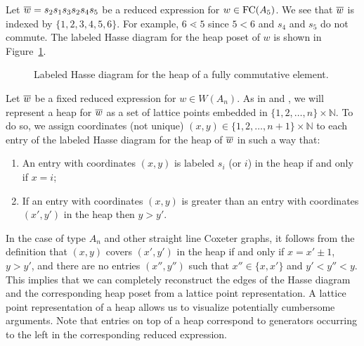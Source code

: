 \begin{example}\label{ex:Hasse}
Let $\overline{w}=s_{2}s_{1}s_{3}s_{2}s_{4}s_{5}$ be a reduced expression for $w \in \operatorname{FC}(A_{5})$. We see that $\overline{w}$ is indexed by $\{1,2,3,4,5,6\}$. For example, $6 \lessdot 5$ since $5<6$ and $s_{4}$ and $s_{5}$ do not commute. The labeled Hasse diagram for the heap poset of $w$ is shown in Figure~\ref{fig:hasse}. 
\begin{figure}[h]
\centering
{}
\caption{Labeled Hasse diagram for the heap of a fully commutative element.}
\label{fig:hasse}
\end{figure}
\end{example}

Let $\overline{w}$ be a fixed reduced expression for $w \in W(A_{n})$.  As in \cite{Billey2007} and \cite{Ernst2010a}, we will represent a heap for $\overline{w}$ as a set of lattice points embedded in $\{1,2,\ldots,n\} \times \mathbb{N}$.  To do so, we assign coordinates (not unique) $(x,y) \in \{1,2,\ldots, n+1\} \times \mathbb{N}$ to each entry of the labeled Hasse diagram for the heap of $\overline{w}$ in such a way that:
\begin{enumerate}[leftmargin=0.6in]
\item An entry with coordinates $(x,y)$ is labeled $s_i$ (or $i$) in the heap if and only if $x = i$; 

\item If an entry with coordinates $(x,y)$ is greater than an entry with coordinates $(x',y')$ in the heap then $y > y'$.
\end{enumerate}

In the case of type $A_{n}$ and other straight line Coxeter graphs, it follows from the definition that $(x,y)$ covers $(x',y')$ in the heap if and only if $x = x' \pm 1$, $y > y'$, and there are no entries $(x'', y'')$ such that $x'' \in \{x, x'\}$ and $y'< y'' < y$.  This implies that we can completely reconstruct the edges of the Hasse diagram and the corresponding heap poset from a lattice point representation. A lattice point representation of a heap allows us to visualize potentially cumbersome arguments.  Note that entries on top of a heap correspond to generators occurring to the left  in the corresponding reduced expression.  


